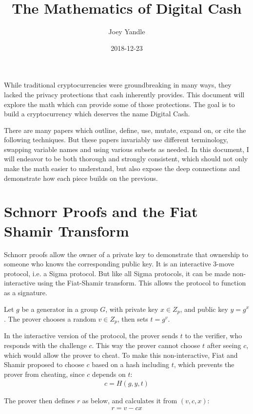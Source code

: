 \documentclass{article}
\title{The Mathematics of Digital Cash}
\date{2018-12-23}
\author{Joey Yandle}
\begin{document}
\maketitle

While traditional cryptocurrencies were groundbreaking in many ways, they lacked the privacy protections that cash inherently provides.  This document will explore the math which can provide some of those protections.  The goal is to build a cryptocurrency which deserves the name Digital Cash.

There are many papers which outline, define, use, mutate, expand on, or cite the following techniques.  But these papers invariably use different terminology, swapping variable names and using various subsets as needed.  In this document, I will endeavor to be both thorough and strongly consistent, which should not only make the math easier to understand, but also expose the deep connections and demonstrate how each piece builds on the previous.
\newpage


\section{
  Schnorr Proofs and the Fiat Shamir Transform
}

Schnorr proofs allow the owner of a private key to demonstrate that ownership to someone who knows the corresponding public key.  It is an interactive 3-move protocol, i.e. a Sigma protocol.  But like all Sigma protocols, it can be made non-interactive using the Fiat-Shamir transform.  This allows the protocol to function as a signature.

Let $g$ be a generator in a group $G$, with private key $x \in Z_p$, and public key $y = g^x$. The prover chooses a random $v \in Z_p$, then sets $t = g^v$.

In the interactive version of the protocol, the prover sends $t$ to the verifier, who responds with the challenge $c$.  This way the prover cannot choose $t$ after seeing $c$, which would allow the prover to cheat.  To make this non-interactive, Fiat and Shamir proposed to choose $c$ based on a hash including $t$, which prevents the prover from cheating, since $c$ depends on $t$:
\begin{eqnarray}
  c = H(g,y,t)
\end{eqnarray}

The prover then defines $r$ as below, and calculates it from $(v, c, x)$:
\begin{eqnarray}
  r = v - cx
\end{eqnarray}
 
\end{document}
